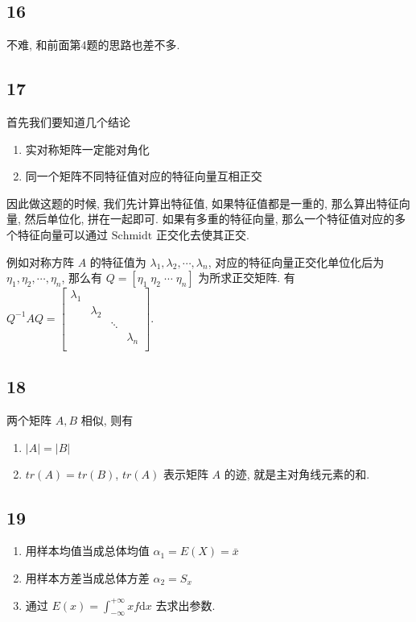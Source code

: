 \documentclass[a4paper, draft]{article}
\begin{document}
\subsection*{16}

不难, 和前面第4题的思路也差不多.

\subsection*{17}

首先我们要知道几个结论

\begin{enumerate}
    \item 实对称矩阵一定能对角化
    \item 同一个矩阵不同特征值对应的特征向量互相正交
\end{enumerate}

因此做这题的时候, 我们先计算出特征值, 如果特征值都是一重的, 
那么算出特征向量, 然后单位化, 拼在一起即可. 如果有多重的特征向量, 
那么一个特征值对应的多个特征向量可以通过 $\text{Schmidt}$ 正交化去使其正交.

例如对称方阵 $A$ 的特征值为 $\lambda_1,\lambda_2,\cdots,\lambda_n$, 
对应的特征向量正交化单位化后为 $\eta_1,\eta_2,\cdots,\eta_n$, 
那么有 $Q=[\eta_1\;\eta_2\;\cdots\;\eta_n]$ 为所求正交矩阵. 
有 $Q^{-1}AQ=\begin{bmatrix}
    \lambda_1 & & & \\
    & \lambda_2 & & \\
    & & \ddots & \\
    & & & \lambda_n\\
\end{bmatrix}$.

\subsection*{18}

两个矩阵 $A,B$ 相似, 则有

\begin{enumerate}
    \item $|A|=|B|$
    \item $tr(A)=tr(B)$, $tr(A)$ 表示矩阵 $A$ 的迹, 就是主对角线元素的和.
\end{enumerate}

\subsection*{19}

\begin{enumerate}
    \item 用样本均值当成总体均值 $\alpha_1=E(X)=\bar{x}$
    \item 用样本方差当成总体方差 $\alpha_2=S_x$
    \item 通过 $E(x)=\int_{-\infty}^{+\infty}xf\text{d}x$ 去求出参数.
\end{enumerate}
\end{document}
